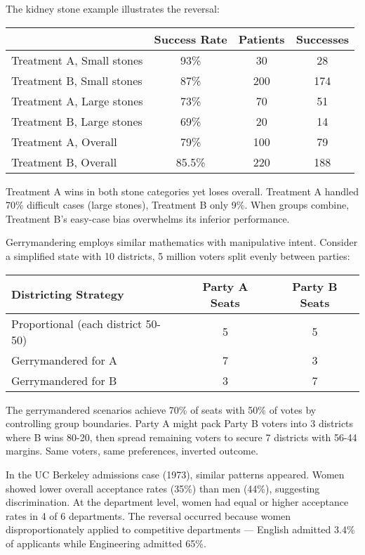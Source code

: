 The kidney stone example illustrates the reversal:

\begin{center}
\begin{tabular}{lccc}
\toprule
 & Success Rate & Patients & Successes \\
\midrule
Treatment A, Small stones & 93\% & 30 & 28 \\
Treatment B, Small stones & 87\% & 200 & 174 \\
Treatment A, Large stones & 73\% & 70 & 51 \\
Treatment B, Large stones & 69\% & 20 & 14 \\
\midrule
Treatment A, Overall & 79\% & 100 & 79 \\
Treatment B, Overall & 85.5\% & 220 & 188 \\
\bottomrule
\end{tabular}
\end{center}

Treatment A wins in both stone categories yet loses overall. Treatment A handled 70\% difficult cases (large stones), Treatment B only 9\%. When groups combine, Treatment B's easy-case bias overwhelms its inferior performance.

Gerrymandering employs similar mathematics with manipulative intent. Consider a simplified state with 10 districts, 5 million voters split evenly between parties:

\begin{center}
\begin{tabular}{lcc}
\toprule
Districting Strategy & Party A Seats & Party B Seats \\
\midrule
Proportional (each district 50-50) & 5 & 5 \\
Gerrymandered for A & 7 & 3 \\
Gerrymandered for B & 3 & 7 \\
\bottomrule
\end{tabular}
\end{center}

The gerrymandered scenarios achieve 70\% of seats with 50\% of votes by controlling group boundaries. Party A might pack Party B voters into 3 districts where B wins 80-20, then spread remaining voters to secure 7 districts with 56-44 margins. Same voters, same preferences, inverted outcome.

In the UC Berkeley admissions case (1973), similar patterns appeared. Women showed lower overall acceptance rates (35\%) than men (44\%), suggesting discrimination. At the department level, women had equal or higher acceptance rates in 4 of 6 departments. The reversal occurred because women disproportionately applied to competitive departments — English admitted 3.4\% of applicants while Engineering admitted 65\%. 

